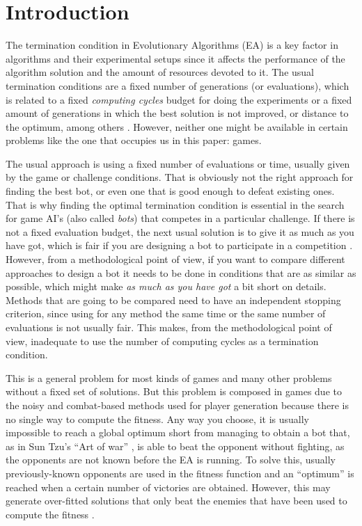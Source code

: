 \documentclass[runningheads,a4paper]{llncs}
\begin{document}
\section{Introduction}

The termination condition in Evolutionary Algorithms (EA) is a key
factor in algorithms and their experimental setups since it affects the performance of
the algorithm solution and the amount of resources devoted to it. The
usual termination conditions are a fixed number of generations (or
evaluations), which is related to a fixed {\em computing cycles}
budget for doing the experiments or a fixed amount of generations in
which the best solution is not improved, or distance to the optimum,
among others \cite{RocheTermination13}. However, neither one might be
available in certain problems like the one that occupies us in this
paper: games. 

The usual approach is using a fixed number of evaluations or time,
usually given by the game or challenge conditions. That is obviously
not the right approach for finding the best bot, or even one that is
good enough to defeat existing ones. That is why finding the optimal termination condition is essential in the search for
game AI's (also called \textit{bots}) that competes in a particular
challenge. If there is not a fixed evaluation budget, the next usual solution is to give
it as much as you have got, which is fair if you are designing a bot 
to participate in a competition \cite{DBLP:conf/cec/Fernandez-AresMGGF11}. However, from a methodological point
of view, if you want to compare different approaches to design a bot
it needs to be done in conditions that are as similar as possible, which
might make {\em as much as you have got} a bit short on
details. Methods that are going to be compared need to have an
independent stopping criterion, since using for any method the same
time or the same number of evaluations is not usually fair. This
makes, from the methodological point of view, inadequate to use the
number of computing cycles as a termination condition. 
 
This is a general problem for most kinds of games and many other
problems without a fixed set of solutions. But this problem is
composed in games due to
the noisy and combat-based methods used for player generation because
there is no single way to compute the fitness. Any way you choose, it
is usually impossible to reach a global optimum short from managing to obtain a bot that, as
in Sun Tzu's ``Art of war'' \cite{tzu2013art}, is able to beat the opponent without
fighting, as the opponents are not known before the EA is running. To
solve this, usually previously-known opponents are used in the fitness
function and an ``optimum'' is reached when a certain number of
victories are obtained. However, this may generate over-fitted
solutions that only beat the  enemies that have been used to compute
the fitness \cite{DBLP:journals/jcst/MoraFGGF12}.
\end{document}
